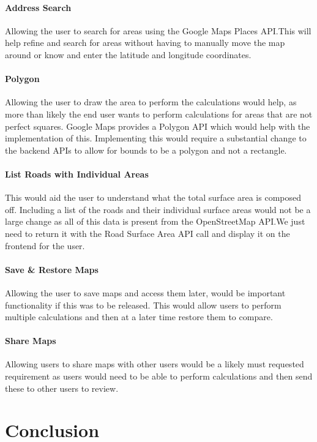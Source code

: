 \documentclass[a4paper,11pt]{article}
\begin{document}
\paragraph{Address Search} Allowing the user to search for areas using the
Google Maps Places API.\@ This will help refine and search for areas without
having to manually move the map around or know and enter the latitude and
longitude coordinates.

\paragraph{Polygon} Allowing the user to draw the area to perform the
calculations would help, as more than likely the end user wants to perform
calculations for areas that are not perfect squares. Google Maps provides a
Polygon API which would help with the implementation of this. Implementing this
would require a substantial change to the backend APIs to allow for bounds to be
a polygon and not a rectangle.

\paragraph{List Roads with Individual Areas} This would aid the user to
understand what the total surface area is composed off. Including a list of the
roads and their individual surface areas would not be a large change as all of
this data is present from the OpenStreetMap API.\@ We just need to return it
with the Road Surface Area API call and display it on the frontend for the user.

\paragraph{Save \& Restore Maps} Allowing the user to save maps and access them
later, would be important functionality if this was to be released. This would
allow users to perform multiple calculations and then at a later time restore
them to compare.

\paragraph{Share Maps} Allowing users to share maps with other users would be a
likely must requested requirement as users would need to be able to perform
calculations and then send these to other users to review.

\section{Conclusion}
\end{document}
